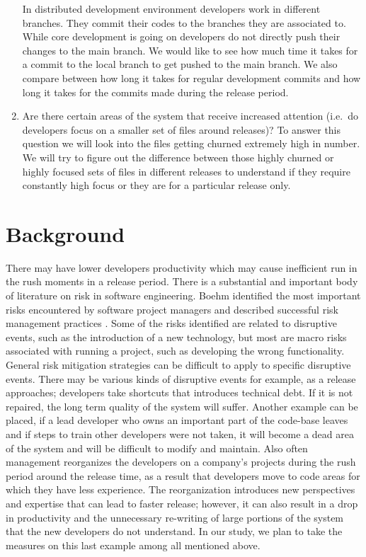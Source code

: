 \documentclass{acm_proc_article-sp}
\begin{document}
\begin{enumerate}
In distributed development environment developers work in different branches. They commit their codes to the branches they are associated to. While core development is going on developers do not directly push their changes to the main branch. We would like to see how much time it takes for a commit to the local branch to get pushed to the main branch. We also compare between how long it takes for regular development commits and how long it takes for the commits made during the release period.
\item Are there certain areas of the system that receive increased attention (i.e.\ do developers focus on a smaller set of files around releases)? \newline
To answer this question we will look into the files getting churned extremely high in number. We will try to figure out the difference between those highly churned or highly focused sets of files in different releases to understand if they require constantly high focus or they are for a particular release only.
\end{enumerate}

\section{Background}
There may have lower developers productivity \cite{cataldo_identification, damian_awareness} which may cause inefficient run in the rush moments in a release period. There is a substantial and important body of literature on risk in software engineering. Boehm identified the most important risks encountered by software project managers and described successful risk management practices \cite{boehm_software_risk, keil_framework, boehm_agile}. Some of the risks identified are related to disruptive events, such as the introduction of a new technology, but most are macro risks associated with running a project, such as developing the wrong functionality. General risk mitigation strategies can be difficult to apply to specific disruptive events. There may be various kinds of disruptive events for example, as a release approaches; developers take shortcuts that introduces technical debt. If it is not repaired, the long term quality of the system will suffer. Another example can be placed, if a lead developer who owns an important part of the code-base leaves and if steps to train other developers were not taken, it will become a dead area of the system and will be difficult to modify and maintain. Also often management reorganizes the developers on a company's projects during the rush period around the release time, as a result that developers move to code areas for which they have less experience. The reorganization introduces new perspectives and expertise that can lead to faster release; however, it can also result in a drop in productivity and the unnecessary re-writing of large portions of the system that the new developers do not understand. In our study, we plan to take the measures on this last example among all mentioned above.
\end{document}
